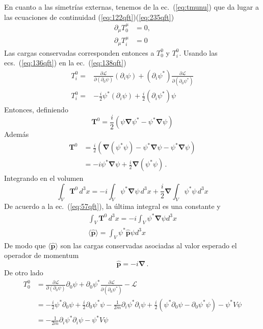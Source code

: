 En cuanto a las simetrías externas, tenemos de la ec.~(\ref{eq:tmunu}) que
da lugar a las ecuaciones de continuidad (\ref{eq:122qft})(\ref{eq:235qft})
\begin{align}
  \partial_\mu T^\mu_0&=0,\nonumber\\
\partial_\mu{T}^\mu_i&=0
\end{align}
Las cargas conservadas corresponden entonces a $T^0_0$ y $T^0_i$.
Usando  las ecs.~(\ref{eq:136qft}) en la ec.~(\ref{eq:138qft})
\begin{align}
  T^0_i=&\frac{\partial\mathcal{L}}{\partial(\partial_0\psi)}(\partial_i\psi)
  +(\partial_i\psi^*)\frac{\partial\mathcal{L}}{\partial(\partial_0\psi^*)}\nonumber\\
  T^0_i=&-\frac{i}{2}\psi^*(\partial_i\psi)+\frac{i}{2}(\partial_i\psi^*)\psi
\end{align}
Entonces, definiendo
\begin{equation}
   \mathbf{T}^0=\frac{i}{2}
  \left(
    \psi\boldsymbol{\nabla}\psi^*-\psi^*\boldsymbol{\nabla}\psi
  \right)
\end{equation}
Además
\begin{align}
 \mathbf{T}^0&=\frac{i}{2}
  \left(
    \boldsymbol{\nabla}(\psi^*\psi)-\psi^*\boldsymbol{\nabla}\psi-\psi^*\boldsymbol{\nabla}\psi
  \right)\nonumber\\
&=-i\psi^*\boldsymbol{\nabla}\psi+\frac{i}{2}\boldsymbol{\nabla}(\psi^*\psi)\,.
\end{align}
Integrando en el volumen
\begin{equation}
  \int_V \mathbf{T}^0\, d^3x=-i\int_V \psi^*\boldsymbol{\nabla}\psi\, d^3x+\frac{i}{2}\boldsymbol{\nabla}\int_V\psi^*\psi\,d^3x
\end{equation}
De acuerdo a la ec.~(\ref{eq:57qft}), la última integral es una constante y
\begin{align}
  \label{eq:140qft}
  \int_V \mathbf{T}^0\, d^3x=-i\int_V \psi^*\boldsymbol{\nabla}\psi d^3x\nonumber\\
\langle\widehat{\mathbf{p}}\rangle=\int_V \psi^*\widehat{\mathbf{p}}\psi d^3x
\end{align}
De modo que $\langle\widehat{\mathbf{p}}\rangle$ son las cargas conservadas asociadas al valor esperado el operador de momentum
\begin{equation}
  \widehat{\mathbf{p}}=-i\boldsymbol{\nabla}\,.
\end{equation}
De otro lado
\begin{align}
  T^0_0&=\frac{\partial\mathcal{L}}{\partial(\partial_0\psi)}{\partial_0\psi}+{\partial_0\psi^*}\frac{\partial\mathcal{L}}{\partial(\partial_0\psi^*)}-\mathcal{L}\nonumber\\
  &=-\frac{i}{2}\psi^*\partial_0\psi+\frac{i}{2}\partial_0\psi^*\psi-\frac{1}{2m}\partial_i\psi^*\partial_i\psi+\frac{i}{2}
  \left(\psi^*\partial_0\psi-\partial_0\psi^*\psi\right)-\psi^*V\psi\nonumber\\
  &=-\frac{1}{2m}\partial_i\psi^*\partial_i\psi-\psi^*V\psi
\end{align}
